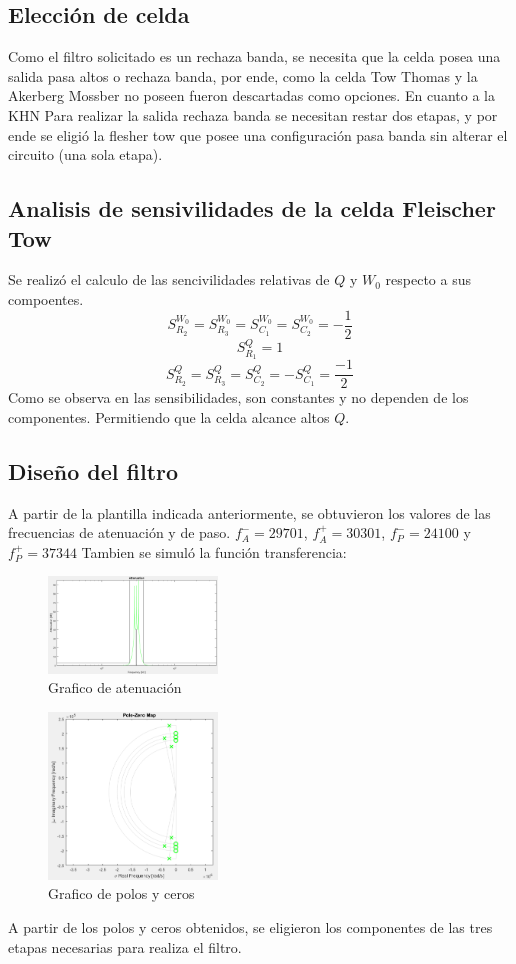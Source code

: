 \documentclass[../../tc_tp5_main.tex]{subfiles}
\begin{document}
\subsection{Elección de celda}
Como el filtro solicitado es un rechaza banda, se necesita que la celda posea una salida pasa altos o rechaza banda, por ende, como  la celda Tow Thomas y la Akerberg Mossber no poseen fueron descartadas como opciones. En cuanto a la KHN Para realizar la salida rechaza banda se necesitan restar dos etapas, y por ende se eligió la flesher tow que posee una configuración pasa banda sin alterar el circuito (una sola etapa).
\subsection{Analisis de sensivilidades de la celda Fleischer Tow}
Se realizó el calculo de las sencivilidades relativas de $Q$ y $W_0$ respecto a sus compoentes.
$$S^{W_0}_{R_2}=S^{W_0}_{R_3}=S^{W_0}_{C_1}=S^{W_0}_{C_2}=- \frac{1}{2}$$
$$S^{Q}_{R_1}= 1$$
$$S^{Q}_{R_2}=S^{Q}_{R_3}=S^{Q}_{C_2}=-S^{Q}_{C_1}=\frac{-1}{2} $$
Como se observa en las sensibilidades, son constantes y no dependen de los componentes. Permitiendo que la celda alcance altos $Q$.


\subsection{Diseño del filtro}
A partir de la plantilla indicada anteriormente, se obtuvieron los valores de las frecuencias de atenuación y de paso.
$ f_A^-=29701 $, $f_A^+=30301 $, $ f_P^-=24100 $ y $ f_P^+=37344 $
Tambien se simuló la función transferencia:
\begin{figure}[H]	
	\centering
	\includegraphics[width=0.4\textwidth]{imagenes/atten.png}
	\caption{Grafico de atenuación}
\end{figure}
\begin{figure}[H]	
	\centering
	\includegraphics[width=0.4\textwidth]{imagenes/polezero.png}
	\caption{Grafico de polos y ceros}
\end{figure}
A partir de los polos y ceros obtenidos, se eligieron los componentes de las tres etapas necesarias para realiza el filtro.
\end{document}
